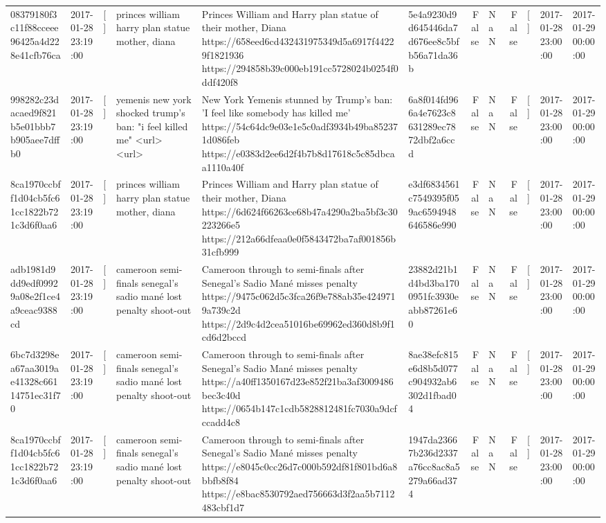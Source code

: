 \begin{tabular}{llllllrlrlll}
08379180f3c11f88cceee96425a4d228e41cfb76ca & 2017-01-28 23:19:00 & [] & princes william harry plan statue mother, diana & Princes William and Harry plan statue of their mother, Diana https://658eed6cd432431975349d5a6917f44229f1821936 https://294858b39c000eb191cc5728024b0254f0ddf420f8 & 5e4a9230d9d645446da7d676ee8c5bfb56a71da36b & False & NaN & False & [] & 2017-01-28 23:00:00 & 2017-01-29 00:00:00 \\
998282c23dacaed9f821b5e01bbb7b905aee7dffb0 & 2017-01-28 23:19:00 & [] & yemenis new york shocked trump's ban: "i feel killed me" <url> <url> & New York Yemenis stunned by Trump's ban: 'I feel like somebody has killed me' https://54c64dc9e03e1e5c0adf3934b49ba852371d086feb https://e0383d2ee6d2f4b7b8d17618c5c85dbcaa1110a40f & 6a8f014fd966a4e7623c8631289ec7872dbf2a6ccd & False & NaN & False & [] & 2017-01-28 23:00:00 & 2017-01-29 00:00:00 \\
8ca1970ccbff1d04cb5fc61cc1822b721c3d6f0aa6 & 2017-01-28 23:19:00 & [] & princes william harry plan statue mother, diana & Princes William and Harry plan statue of their mother, Diana https://6d624f66263ce68b47a4290a2ba5bf3c30223266e5 https://212a66dfeaa0e0f5843472ba7af001856b31cfb999 & e3df6834561c7549395f059ac6594948646586e990 & False & NaN & False & [] & 2017-01-28 23:00:00 & 2017-01-29 00:00:00 \\
adb1981d9dd9edf09929a08e2f1ce4a9ceac9388cd & 2017-01-28 23:19:00 & [] & cameroon semi-finals senegal's sadio mané lost penalty shoot-out & Cameroon through to semi-finals after Senegal’s Sadio Mané misses penalty https://9475c062d5c3fca26f9e788ab35e4249719a739c2d https://2d9c4d2cea51016be69962ed360d8b9f1cd6d2bccd & 23882d21b1d4bd3ba1700951fc3930eabb87261e60 & False & NaN & False & [] & 2017-01-28 23:00:00 & 2017-01-29 00:00:00 \\
6bc7d3298ea67aa3019ae41328c66114751ec31f70 & 2017-01-28 23:19:00 & [] & cameroon semi-finals senegal's sadio mané lost penalty shoot-out & Cameroon through to semi-finals after Senegal’s Sadio Mané misses penalty https://a40ff1350167d23e852f21ba3af3009486bec3c40d https://0654b147c1cdb5828812481fc7030a9dcfccadd4c8 & 8ae38efc815e6d8b5d077c904932ab6302d1fbad04 & False & NaN & False & [] & 2017-01-28 23:00:00 & 2017-01-29 00:00:00 \\
8ca1970ccbff1d04cb5fc61cc1822b721c3d6f0aa6 & 2017-01-28 23:19:00 & [] & cameroon semi-finals senegal's sadio mané lost penalty shoot-out & Cameroon through to semi-finals after Senegal’s Sadio Mané misses penalty https://e8045c0cc26d7c000b592df81f801bd6a8bbfb8f84 https://e8bac8530792aed756663d3f2aa5b7112483cbf1d7 & 1947da23667b236d2337a76cc8ac8a5279a66ad374 & False & NaN & False & [] & 2017-01-28 23:00:00 & 2017-01-29 00:00:00 \\

\end{tabular}
